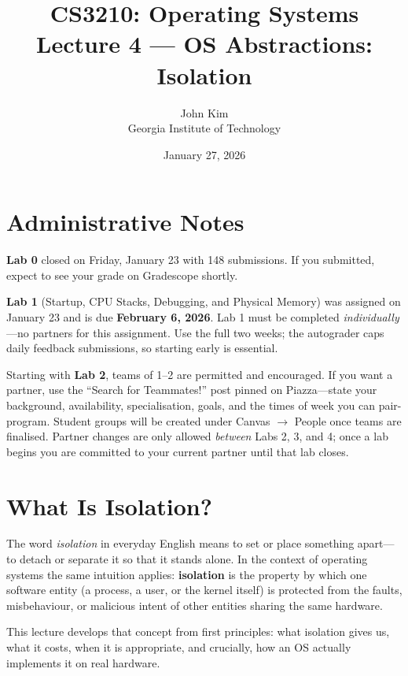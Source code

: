 \documentclass[11pt]{article}
\title{\textbf{CS3210: Operating Systems} \\ Lecture 4 --- OS Abstractions: Isolation}
\author{John Kim \\ Georgia Institute of Technology}
\date{January 27, 2026}
\begin{document}
\maketitle
\tableofcontents
\newpage

\section{Administrative Notes}

\textbf{Lab 0} closed on Friday, January 23 with 148 submissions. If you submitted,
expect to see your grade on Gradescope shortly.

\textbf{Lab 1} (Startup, CPU Stacks, Debugging, and Physical Memory) was assigned on
January 23 and is due \textbf{February 6, 2026}. Lab 1 must be completed
\emph{individually}---no partners for this assignment. Use the full two weeks; the
autograder caps daily feedback submissions, so starting early is essential.

Starting with \textbf{Lab 2}, teams of 1--2 are permitted and encouraged. If you want a
partner, use the ``Search for Teammates!'' post pinned on Piazza---state your background,
availability, specialisation, goals, and the times of week you can pair-program. Student
groups will be created under Canvas $\to$ People once teams are finalised. Partner changes
are only allowed \emph{between} Labs 2, 3, and 4; once a lab begins you are committed
to your current partner until that lab closes.

\section{What Is Isolation?}

The word \emph{isolation} in everyday English means to set or place something apart---to
detach or separate it so that it stands alone. In the context of operating systems the same
intuition applies: \textbf{isolation} is the property by which one software entity (a
process, a user, or the kernel itself) is protected from the faults, misbehaviour, or
malicious intent of other entities sharing the same hardware.

This lecture develops that concept from first principles: what isolation gives us, what it
costs, when it is appropriate, and crucially, how an OS actually implements it on real
hardware.
\end{document}

